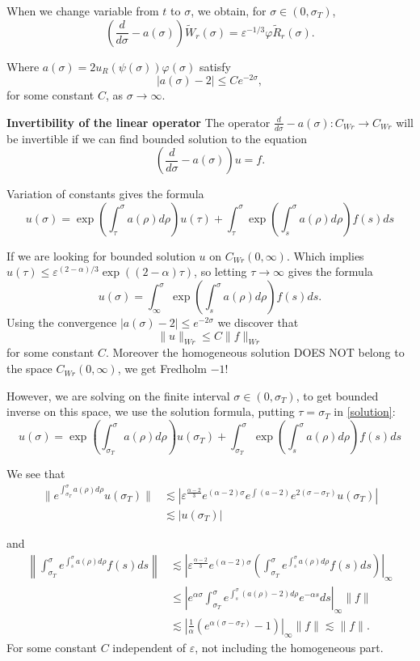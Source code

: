 \documentclass[letterpaper,11pt]{article}
\newcommand{\eps}{\varepsilon}
\newcommand{\lar}{ \lesssim }
\numberwithin{equation}{section}
\theoremstyle{plain}
\begin{document}
When we change variable from $t$ to $\sigma$, we obtain, for $\sigma \in (0,\sigma_T)$,
\[
\left(\frac{d}{d\sigma} -a(\sigma) \right)\tilde{W}_r(\sigma)  = \eps^{-1/3}\varphi \tilde{R}_r(\sigma).
\]

Where $a(\sigma) = 2u_R(\psi(\sigma))\varphi(\sigma)$ satisfy
\[
|a(\sigma)-2| \le Ce^{-2\sigma},
\]
for some constant $C$, as $\sigma \to \infty$.

\textbf{Invertibility of the linear operator} 
The operator $\frac{d}{d\sigma}-a(\sigma) : C_{Wr} \to C_{Wr}$ will be invertible if we can find bounded solution to the equation
\[
\left(\frac{d}{d\sigma}-a(\sigma) \right) u = f.
\]

Variation of constants gives the formula
\begin{equation}\label{solution}
u(\sigma) = \exp\left(\int_\tau^\sigma a(\rho)d\rho\right)u(\tau) + \int_\tau^\sigma \exp\left(\int_s^\sigma a(\rho)d\rho\right)f(s)ds
\end{equation}


If we are looking for bounded solution $u$ on 
$C_{Wr}(0,\infty)$. Which implies $u(\tau) \le 
\eps^{(2-\alpha)/3}\exp\left((2-\alpha)\tau
\right)$, so letting $\tau \to \infty$ gives the formula
\[
u(\sigma) = \int_\infty^\sigma \exp\left(\int_s^\sigma a(\rho)d\rho \right)f(s)ds.
\]
Using the convergence $|a(\sigma)-2|\le e^{-2\sigma}$ we discover that
\[
\|u\|_{Wr} \le C \|f\|_{Wr}
\]
for some constant $C$. Moreover the homogeneous solution DOES NOT belong to the space $C_{Wr}(0,\infty)$, we get Fredholm $-1$!

However, we are solving on the finite interval $\sigma \in (0,\sigma_T)$, to get bounded inverse on this space, we use the solution formula, putting $\tau = \sigma_T$ in \eqref{solution}:
\[
u(\sigma) = \exp\left(\int_{\sigma_T}^\sigma a(\rho)d\rho\right)u(\sigma_T) + \int_{\sigma_T}^\sigma \exp\left(\int_s^\sigma a(\rho)d\rho\right)f(s)ds
\]


We see that 
\begin{align*}
\| e^{\int_{\sigma_T}^\sigma a(\rho
)d\rho }u(\sigma_T)\| &\lar \left|\eps^{\frac{\alpha-2}{3}}e^{(\alpha-2)\sigma}e^{\int (a-2)} e^{2(\sigma-\sigma_T)}u(\sigma_T)\right| \\
&\lar |u(\sigma_T)|
\end{align*}

and
\begin{align*}
\left\|\int_{\sigma_T}^\sigma e^{\int_s^\sigma a(\rho)d\rho}f(s)ds\right\| &\lar \left|\eps^{\frac{\alpha-2}{3}}e^{(\alpha-2)\sigma}\left(\int_{\sigma_T}^\sigma e^{\int_s^\sigma a(\rho)d\rho}f(s)ds\right)\right|_\infty \\
& \le \left| e^{\alpha\sigma}\int_{\sigma_T}^\sigma e^{\int_s^\sigma (a(\rho)-2)d\rho} e^{-\alpha s}ds \right|_\infty \|f\|\\
& \lar \left|\frac{1}{\alpha} \left(e^{\alpha(\sigma-\sigma_T)}-1 \right) \right|_\infty \|f\|\lar \|f\|.
\end{align*}
For some constant $C$ independent of $\eps$, not including the homogeneous part.
\end{document}
